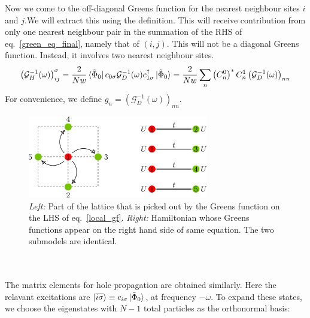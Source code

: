\documentclass[12pt]{article}
\numberwithin{equation}{section}
\begin{document}
Now we come to the off-diagonal Greens function for the nearest neighbour sites $i$ and $j$.We will extract this using the definition. This will receive contribution from only one nearest neighbour pair in the summation of the RHS of eq.~\ref{green_eq_final}, namely that of $\left(i,j\right)$. This will not be a diagonal Greens function. Instead, it involves two nearest neighbour sites. %
\begin{gather}
\label{nn_gf}
\left(\mathcal{G}_{H}^{-1}(\omega)\right)_{ij}^\sigma = \frac{2}{Nw}\bra{\tilde \Phi_0}c_{0\sigma}\mathcal{G}_{D}^{-1}(\omega)c^\dagger_{1\sigma}\ket{\tilde \Phi_0} = \frac{2}{Nw}\sum_{n} \left(C^0_{n}\right)^* C^1_{n} \left(\mathcal{G}_{D}^{-1}(\omega)\right)_{nn} 
\end{gather}
For convenience, we define $g_n = \left(\mathcal{G}_{D}^{-1}(\omega)\right)_{nn}$.
\begin{figure}[htpb!]
	\centering
	\hspace*{\fill}
	\includegraphics[width=0.7\textwidth]{./lattice.png}
	\hspace*{\fill}
	\caption{\textit{Left:} Part of the lattice that is picked out by the Greens function on the LHS of eq.~\ref{local_gf}. \textit{Right:} Hamiltonian whose Greens functions appear on the right hand side of same equation. The two submodels are identical.}
\end{figure}
\\\\
The matrix elements for hole propagation are obtained similarly. Here the relavant excitations are $\ket{\overline{i\sigma}} \equiv c_{i\sigma}\ket{\tilde \Phi_0}$, at frequency $-\omega$. To expand these states, we choose the eigenstates with $N-1$ total particles as the orthonormal basis:
\end{document}
